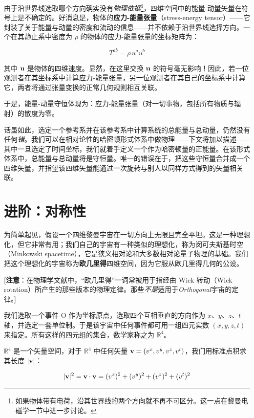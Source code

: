 由于沿世界线选取哪个方向确实没有\emph{物理依据}\footnote{如果物体带有电荷，沿其世界线的两个方向就不再不可区分。这一点在黎曼电磁学一节中进一步讨论。}，四维空间中的能量-动量矢量在符号上是不确定的。好消息是，物体的\textbf{应力-能量张量}（stress-energy tensor）——它封装了关于能量与动量的密度和流动的信息——并不依赖于沿世界线选择方向。一个在其静止系中密度为 $\rho$ 的物体的应力-能量张量的坐标矩阵为：

\begin{equation}
T^{ab} = \rho\, u^{a} u^{b}
\end{equation}

其中 $\mathbf{u}$ 是物体的四维速度。显然，在这里交换 $\mathbf{u}$ 的符号毫无影响！因此，若一位观测者在其坐标系中计算应力-能量张量，另一位观测者在其自己的坐标系中计算它，两者将通过张量变换的正常几何规则相互关联。

于是，能量-动量守恒体现为：应力-能量张量（对一切事物，包括所有物质与辐射）的散度为零。

话虽如此，选定一个参考系并在该参考系中计算系统的总能量与总动量，仍然没有任何\emph{错}。我们可以在相对论性的哈密顿形式体系中做物理——下文将加以描述——其中一旦选定了时间坐标，我们就着手定义一个作为哈密顿量的正能量。在该形式体系中，总能量与总动量将是守恒量。唯一的错误在于，把这些守恒量合并成一个四维矢量，并指望该四维矢量能通过一次旋转与别人以同样方式得到的矢量相关联。

\section{进阶：对称性}

为简单起见，假设一个四维黎曼宇宙在一切方向上无限且完全平坦。这是一种理想化，但它非常有用；我们自己的宇宙有一种类似的理想化，称为闵可夫斯基时空（Minkowski spacetime），它是狭义相对论和大多数相对论量子物理的基础。我们把这个理想化的宇宙称为\textbf{欧几里得}四维空间，因为它服从欧几里得几何的公设。

[\textbf{注意}：在物理学文献中，“欧几里得”一词常被用于指经由 Wick 转动（Wick rotation）所产生的那些版本的物理定律。那些\emph{不是}适用于\emph{Orthogonal}宇宙的定律。]

我们选取一个事件 O 作为坐标原点，选取四个互相垂直的方向作为 $x$、$y$、$z$、$t$ 轴，并选定一套单位制。于是该宇宙中任何事件都可用一组四元实数 $(x,y,z,t)$ 来指定。所有这样的四元组的集合，数学家称之为 $\mathbb{R}^{4}$。

$\mathbb{R}^{4}$ 是一个矢量空间，对于 $\mathbb{R}^{4}$ 中任何矢量 $\mathbf{v}=(v^{x},v^{y},v^{z},v^{t})$，我们用标准点积求其长度 $|\mathbf{v}|$：

\begin{equation}
|\mathbf{v}|^{2} = \mathbf{v}\cdot\mathbf{v} = (v^{x})^{2} + (v^{y})^{2} + (v^{z})^{2} + (v^{t})^{2}
\end{equation}

